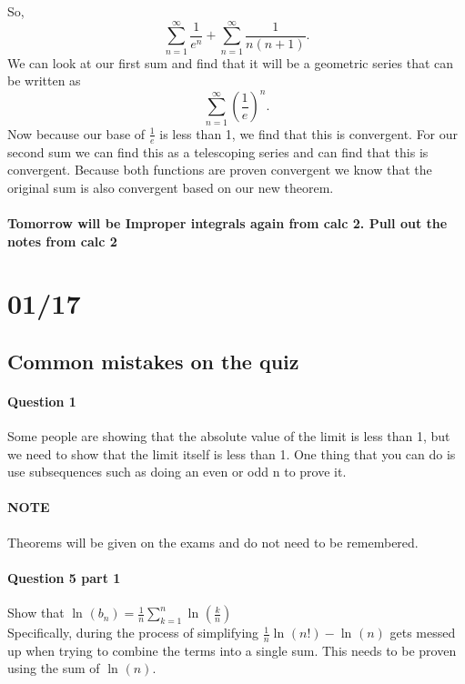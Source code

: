 So,
\[
\sum_{ n=1 } ^{ \infty } \frac{ 1 }{ e^{ n } } +\sum_{ n=1 } ^{ \infty } \frac{ 1 }{ n\left( n+1 \right)  } 
.\] 
We can look at our first sum and find that it will be a geometric series that can be written as
\[
\sum_{ n=1 } ^{ \infty } \left( \frac{ 1 }{ e }  \right) ^{ n }
.\] 
Now because our base of $ \frac{ 1 }{ e }  $ is less than 1, we find that this is convergent. For our second sum we can find this as a telescoping series and can find that this is convergent. Because both functions are proven convergent we know that the original sum is also convergent based on our new theorem.

\paragraph{Tomorrow will be Improper integrals again from calc 2. Pull out the notes from calc 2}

\section{01/17}%
\label{sec:01/17}

\subsection{Common mistakes on the quiz}%
\label{sub:Common mistakes on the quiz}
\paragraph{Question 1}
Some people are showing that the absolute value of the limit is less than 1, but we need to show that the limit itself is less than 1. One thing that you can do is use subsequences such as doing an even or odd n to prove it.

\paragraph{NOTE}
Theorems will be given on the exams and do not need to be remembered. 

\paragraph{Question 5 part 1}
Show that $ \ln^{  } \left( b_n \right) = \frac{ 1 }{ n } \sum_{ k=1 } ^{ n } \ln^{  } \left( \frac{ k }{ n }  \right) $ \\

Specifically, during the process of simplifying $ \frac{ 1 }{ n } \ln^{  } \left( n! \right) -\ln^{  } \left( n \right) $ gets messed up when trying to combine the terms into a single sum. This needs to be proven using the sum of $ \ln^{  } \left( n \right)  $.



